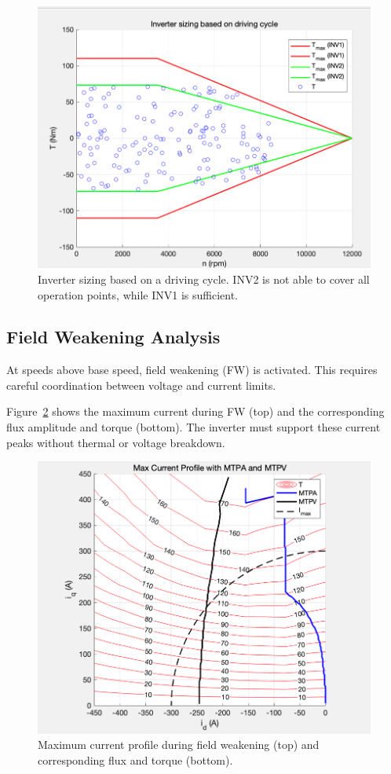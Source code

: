 \begin{figure}[!h]
    \centering
    \includegraphics[width=0.8\linewidth]{Figures/Inverter sizing based on a driving cycle.png}
    \caption{Inverter sizing based on a driving cycle. INV2 is not able to cover all operation points, while INV1 is sufficient.}
    \label{fig:inv_sizing}
\end{figure}

\subsection{Field Weakening Analysis}

At speeds above base speed, field weakening (FW) is activated. This requires careful coordination between voltage and current limits.

Figure~\ref{fig:fw_max_current} shows the maximum current during FW (top) and the corresponding flux amplitude and torque (bottom). The inverter must support these current peaks without thermal or voltage breakdown.

\begin{figure}[!h]
    \centering
    \includegraphics[width=0.8\linewidth]{Figures/Max current profile during FW.png}
    \caption{Maximum current profile during field weakening (top) and corresponding flux and torque (bottom).}
    \label{fig:fw_max_current}
\end{figure}

